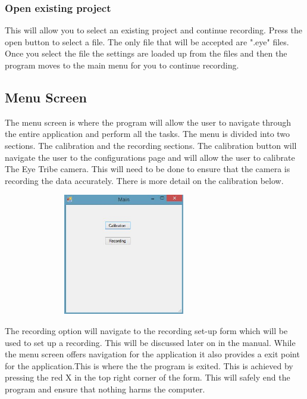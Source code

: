 \subsubsection{Open existing project} 
This will allow you to select an existing project and continue recording. Press the open button to select a file. The only file that will be accepted are ".eye" files. Once you select the file the settings are loaded up from the files and then the program moves to the main menu for you to continue recording.

\subsection{Menu Screen}
The menu screen is where the program will allow the user to navigate through the entire application and perform all the tasks. The menu is divided into two sections. The calibration and the recording sections. The calibration button will navigate the user to the configurations page and will allow the user to calibrate The Eye Tribe camera. This will need to be done to ensure that the camera is recording the data accurately. There is more detail on the calibration below.

\includegraphics[width=400px,height=200px]{./Images/Mainpage.JPG}

The recording option will navigate to the recording set-up form which will be used to set up a recording. This will be discussed later on in the manual. While the menu screen offers navigation for the application it also provides a exit point for the application.This is where the the program is exited. This is achieved by pressing the red X in the top right corner of the form. This will safely end the program and ensure that nothing harms the computer.

